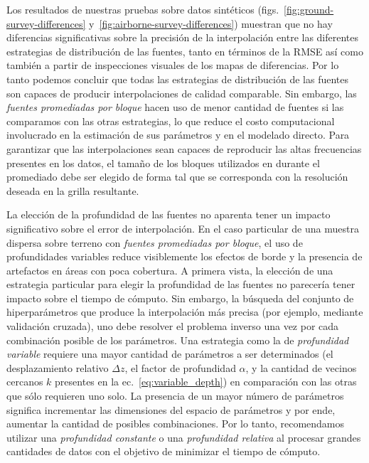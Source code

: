 Los resultados de nuestras pruebas sobre datos sintéticos
(figs.~\ref{fig:ground-survey-differences}
y~\ref{fig:airborne-survey-differences})
muestran que no hay diferencias significativas sobre la precisión de la
interpolación entre las diferentes estrategias de distribución de las fuentes,
tanto en términos de la \ac{RMSE} así como también a partir de inspecciones
visuales de los mapas de diferencias.
Por lo tanto podemos concluir que todas las estrategias de distribución de las
fuentes son capaces de producir interpolaciones de calidad comparable.
Sin embargo, las \emph{fuentes promediadas por bloque} hacen uso de menor
cantidad de fuentes si las comparamos con las otras estrategias, lo que reduce
el costo computacional involucrado en la estimación de sus parámetros y en el
modelado directo.
Para garantizar que las interpolaciones sean capaces de reproducir las altas
frecuencias presentes en los datos, el tamaño de los bloques utilizados en
durante el promediado debe ser elegido de forma tal que se corresponda con la
resolución deseada en la grilla resultante.

La elección de la profundidad de las fuentes no aparenta tener un impacto
significativo sobre el error de interpolación.
En el caso particular de una muestra dispersa sobre terreno
con \emph{fuentes promediadas por bloque}, el uso de profundidades variables
reduce visiblemente los efectos de borde y la presencia de artefactos en áreas
con poca cobertura.
A primera vista, la elección de una estrategia particular para elegir la
profundidad de las fuentes no parecería tener impacto sobre el tiempo de
cómputo.
Sin embargo, la búsqueda del conjunto de hiperparámetros que produce la
interpolación más precisa (por ejemplo, mediante validación cruzada), uno debe
resolver el problema inverso una vez por cada combinación posible de los
parámetros.
Una estrategia como la de \emph{profundidad variable} requiere una mayor
cantidad de parámetros a ser determinados (el desplazamiento relativo $\Delta
z$, el factor de profundidad $\alpha$, y la cantidad de vecinos cercanos $k$
presentes en la ec.~\ref{eq:variable_depth})
en comparación con las otras que sólo requieren uno solo.
La presencia de un mayor número de parámetros significa incrementar las
dimensiones del espacio de parámetros y por ende, aumentar la cantidad de
posibles combinaciones.
Por lo tanto, recomendamos utilizar una \emph{profundidad constante} o una
\emph{profundidad relativa} al procesar grandes cantidades de datos con el
objetivo de minimizar el tiempo de cómputo.


